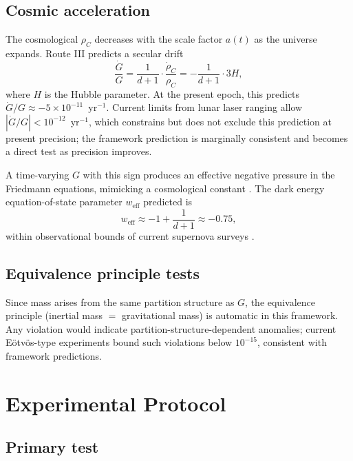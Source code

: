 \documentclass[11pt,twocolumn,a4paper]{article}
\theoremstyle{definition}
\theoremstyle{remark}
\newcommand{\Gnewton}{G}
\begin{document}
\subsection{Cosmic acceleration}

The cosmological $\rho_C$ decreases with the scale factor $a(t)$ as the universe expands. Route III predicts a secular drift
\begin{equation}
\frac{\dot\Gnewton}{\Gnewton} = \frac{1}{d+1}\cdot\frac{\dot\rho_C}{\rho_C} = -\frac{1}{d+1}\cdot 3H,
\end{equation}
where $H$ is the Hubble parameter. At the present epoch, this predicts $\dot\Gnewton/\Gnewton \approx -5 \times 10^{-11}$~yr$^{-1}$. Current limits from lunar laser ranging \citep{hofmann2010} allow $|\dot\Gnewton/\Gnewton| < 10^{-12}$~yr$^{-1}$, which constrains but does not exclude this prediction at present precision; the framework prediction is marginally consistent and becomes a direct test as precision improves.

A time-varying $\Gnewton$ with this sign produces an effective negative pressure in the Friedmann equations, mimicking a cosmological constant \citep{uzan2011}. The dark energy equation-of-state parameter $w_\text{eff}$ predicted is
\begin{equation}
w_\text{eff} \approx -1 + \frac{1}{d+1} \approx -0.75,
\end{equation}
within observational bounds of current supernova surveys \citep{scolnic2018}.

\subsection{Equivalence principle tests}

Since mass arises from the same partition structure as $\Gnewton$, the equivalence principle (inertial mass $=$ gravitational mass) is automatic in this framework. Any violation would indicate partition-structure-dependent anomalies; current E\"otv\"os-type experiments \citep{touboul2017} bound such violations below $10^{-15}$, consistent with framework predictions.

\section{Experimental Protocol}
\label{sec:experimental}

\subsection{Primary test}
\end{document}
